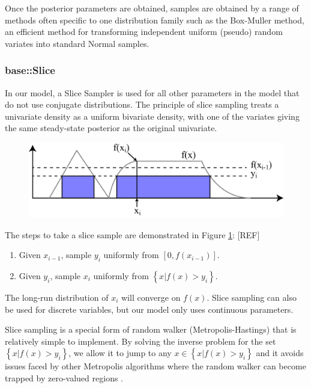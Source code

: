 \documentclass[a4paper, 12pt]{article}
\begin{document}
Once the posterior parameters are obtained, samples are obtained by a range of methods often specific to one distribution family such as the Box-Muller method, an efficient method for transforming independent uniform (pseudo) random variates into standard Normal samples.

\subsubsection{base::Slice}
In our model, a Slice Sampler is used for all other parameters in the model that do not use conjugate distributions. The principle of slice sampling treats a univariate density as a uniform bivariate density, with one of the variates giving the same steady-state posterior as the original univariate.

\begin{figure}
  \centering
  \includegraphics[width=0.5\linewidth]{media/slice_sampling}
  \label{fig:slice_sampling}
\end{figure}

The steps to take a slice sample are demonstrated in Figure \ref{fig:slice_sampling}: [REF]

\begin{enumerate}
\item Given $x_{i-1}$, sample $y_i$ uniformly from $[0, f(x_{i-1})]$.
\item Given $y_i$, sample $x_i$ uniformly from $\left\{ x | f(x) > y_i \right\}$.
\end{enumerate}

The long-run distribution of $x_i$ will converge on $f(x)$. Slice sampling can also be used for discrete variables, but our model only uses continuous parameters.

Slice sampling is a special form of random walker (Metropolis-Hastings) that is relatively simple to implement. By solving the inverse problem for the set $\left\{ x | f(x) > y_i \right\}$, we allow it to jump to any $x\in \left\{ x | f(x) > y_i \right\}$ and it avoids issues faced by other Metropolis algorithms where the random walker can become trapped by zero-valued regions .
\end{document}
